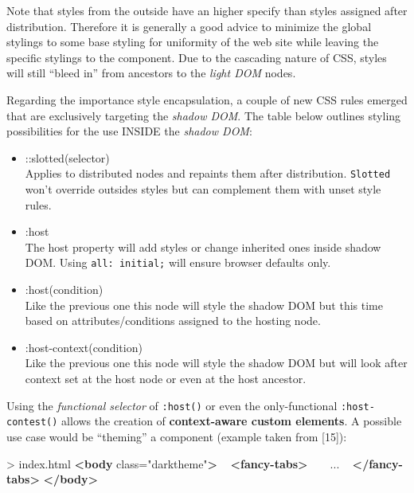 \documentclass[]{article}
\newenvironment{Shaded}{}{}
\newcommand{\KeywordTok}[1]{\textcolor[rgb]{0.00,0.44,0.13}{\textbf{{#1}}}}
\newcommand{\StringTok}[1]{\textcolor[rgb]{0.25,0.44,0.63}{{#1}}}
\newcommand{\OtherTok}[1]{\textcolor[rgb]{0.00,0.44,0.13}{{#1}}}
\newcommand{\NormalTok}[1]{{#1}}
\providecommand{\tightlist}{%
  \setlength{\itemsep}{0pt}\setlength{\parskip}{0pt}}
\begin{document}
Note that styles from the outside have an higher specify than styles
assigned after distribution. Therefore it is generally a good advice to
minimize the global stylings to some base styling for uniformity of the
web site while leaving the specific stylings to the component. Due to
the cascading nature of CSS, styles will still ``bleed in'' from
ancestors to the \emph{light DOM} nodes.

Regarding the importance style encapsulation, a couple of new CSS rules
emerged that are exclusively targeting the \emph{shadow DOM}. The table
below outlines styling possibilities for the use INSIDE the \emph{shadow
DOM}:

\begin{itemize}
\tightlist
\item
  ::slotted(selector)\\
  Applies to distributed nodes and repaints them after distribution.
  \texttt{Slotted} won't override outsides styles but can complement
  them with unset style rules.
\item
  :host\\
  The host property will add styles or change inherited ones inside
  shadow DOM. Using \texttt{all:\ initial;} will ensure browser defaults
  only.
\item
  :host(condition)\\
  Like the previous one this node will style the shadow DOM but this
  time based on attributes/conditions assigned to the hosting node.
\item
  :host-context(condition)\\
  Like the previous one this node will style the shadow DOM but will
  look after context set at the host node or even at the host ancestor.
\end{itemize}

Using the \emph{functional selector} of \texttt{:host()} or even the
only-functional \texttt{:host-contest()} allows the creation of
\textbf{context-aware custom elements}. A possible use case would be
``theming'' a component (example taken from {[}15{]}):

\begin{Shaded}
\begin{Highlighting}[]
\NormalTok{> index.html}
\KeywordTok{<body}\OtherTok{ class=}\StringTok{"darktheme"}\KeywordTok{>}
  \KeywordTok{<fancy-tabs>}
    \NormalTok{...}
  \KeywordTok{</fancy-tabs>}
\KeywordTok{</body>}
\end{Highlighting}
\end{Shaded}
\end{document}
